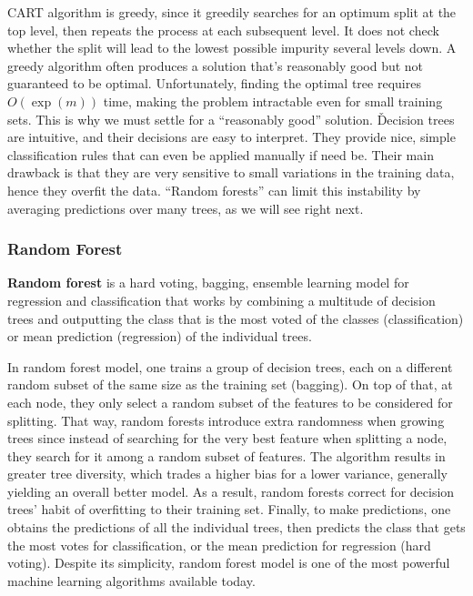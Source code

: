 CART algorithm is greedy, since it greedily searches for an optimum split at the top level, then repeats the process
at each subsequent level. It does not check whether the split will lead to the lowest possible impurity
several levels down. A greedy algorithm often produces a solution that's reasonably good but not guaranteed to be
optimal. Unfortunately, finding the optimal tree requires $O(\exp(m))$ time, making the problem intractable even for
small training sets. This is why we must settle for a ``reasonably good'' solution. \v

Decision trees are intuitive, and their decisions are easy to interpret. They provide nice, simple classification
rules that can even be applied manually if need be. Their main drawback is that they are very sensitive to small
variations in the training data, hence they overfit the data. ``Random forests'' can limit this instability by
averaging predictions over many trees, as we will see right next.

\subsubsection{Random Forest}

\textbf{Random forest} is a hard voting, bagging, ensemble learning model for regression and classification that works
by combining a multitude of decision trees and outputting the class that is the most voted of the classes
(classification) or mean prediction (regression) of the individual trees.
\ed

In random forest model, one trains a group of decision trees, each on a different random subset of the same size as
the training set (bagging). On top of that, at each node, they only select a random subset of the features to be
considered for splitting. That way, random forests introduce extra randomness when growing trees since instead of
searching for the very best feature when splitting a node, they search for it among a random subset of features. The
algorithm results in greater tree diversity, which trades a higher bias for a lower variance, generally yielding an
overall better model. As a result, random forests correct for decision trees' habit of overfitting to their training
set. Finally, to make predictions, one obtains the predictions of all the individual trees, then predicts the class
that gets the most votes for classification, or the mean prediction for regression (hard voting). Despite its
simplicity, random forest model is one of the most powerful machine learning algorithms available today.

